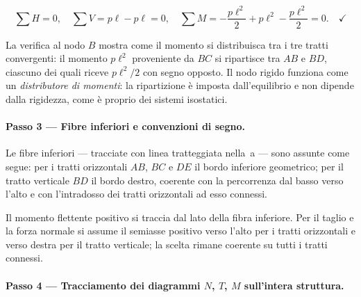 \[
\sum H = 0, \quad
\sum V = p\ell - p\ell = 0, \quad
\sum M = -\frac{p\ell^2}{2} + p\ell^2
- \frac{p\ell^2}{2} = 0.
\quad\checkmark
\]

\begin{oss}
	La verifica al nodo $B$ mostra come il
	momento si distribuisca tra i tre tratti
	convergenti: il momento $p\ell^2$ proveniente
	da $BC$ si ripartisce tra $AB$ e $BD$,
	ciascuno dei quali riceve $p\ell^2/2$
	con segno opposto. Il nodo rigido funziona
	come un \emph{distributore di momenti}:
	la ripartizione è imposta dall'equilibrio
	e non dipende dalla rigidezza, come è
	proprio dei sistemi isostatici.
\end{oss}








\paragraph{Passo 3 --- Fibre inferiori e convenzioni di segno.}

Le fibre inferiori --- tracciate con linea
tratteggiata nella \,a
--- sono assunte come segue: per i tratti
orizzontali $AB$, $BC$ e $DE$ il bordo inferiore
geometrico; per il tratto verticale $BD$ il bordo
destro, coerente con la percorrenza dal basso
verso l'alto e con l'intradosso dei tratti
orizzontali ad esso connessi.

Il momento flettente positivo si traccia dal
lato della fibra inferiore. Per il taglio e
la forza normale si assume il semiasse positivo
verso l'alto per i tratti orizzontali e verso
destra per il tratto verticale; la scelta
rimane coerente su tutti i tratti connessi.

\paragraph{Passo 4 --- Tracciamento dei diagrammi	$N$, $T$, $M$ sull'intera struttura.}





